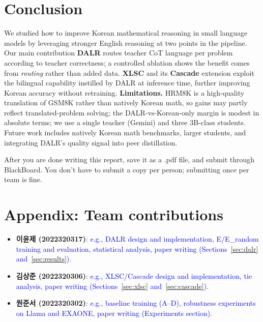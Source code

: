 \documentclass{article}
\newcommand{\note}[1]{\textcolor{blue}{{#1}}}
\begin{document}
\section{Conclusion}
We studied how to improve Korean mathematical reasoning in small
language models by leveraging stronger English reasoning at two
points in the pipeline. Our main contribution \textbf{DALR} routes
teacher CoT language per problem according to teacher correctness; a
controlled ablation shows the benefit comes from \emph{routing}
rather than added data. \textbf{XLSC} and its \textbf{Cascade}
extension exploit the bilingual capability instilled by DALR at
inference time, further improving Korean accuracy without retraining.
\textbf{Limitations.} HRM8K is a high-quality translation of GSM8K
rather than natively Korean math, so gains may partly reflect
translated-problem solving; the DALR-vs-Korean-only margin is modest
in absolute terms; we use a single teacher (Gemini) and three 3B-class
students. Future work includes natively Korean math benchmarks, larger
students, and integrating DALR's quality signal into peer
distillation.

After you are done writing this report, save it as a .pdf file, and submit through BlackBoard. You don't have to submit a copy per person; submitting once per team is fine.




\newpage
\appendix

\section*{Appendix: Team contributions}
\begin{itemize}
  \item \textbf{이윤제 (2022320317)}: \note{e.g., DALR design and
  implementation, E/E\_random training and evaluation, statistical
  analysis, paper writing (Sections~\ref{sec:dalr} and~\ref{sec:results}).}
  \item \textbf{김상준 (2022320306)}: \note{e.g., XLSC/Cascade design
  and implementation, tie analysis, paper writing
  (Sections~\ref{sec:xlsc} and~\ref{sec:cascade}).}
  \item \textbf{원준서 (2022320302)}: \note{e.g., baseline training
  (A--D), robustness experiments on Llama and EXAONE, paper writing
  (Experiments section).}
\end{itemize}
\end{document}

